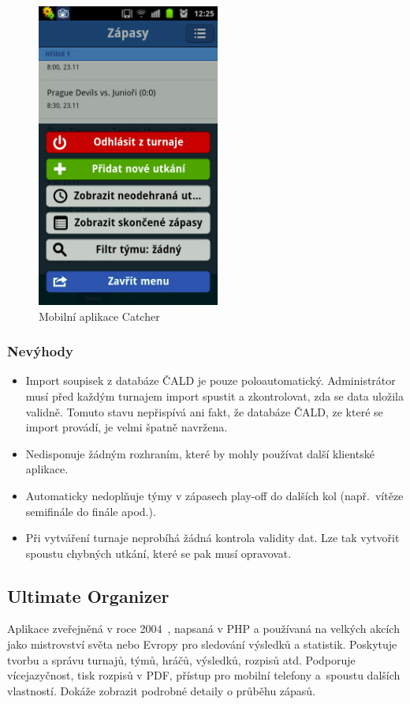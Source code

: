 \begin{figure}[ht!]
\centering
\includegraphics[width=60mm]{./images/catcher.png}
\caption{Mobilní aplikace Catcher~\cite{catcher_play}\label{overflow}}
\label{fig:uwsgi}
\end{figure}

\subsubsection*{Nevýhody}
\begin{itemize}
  \item Import soupisek z databáze ČALD je pouze poloautomatický. Administrátor musí před každým turnajem
    import spustit a zkontrolovat, zda se data uložila validně. Tomuto stavu nepřispívá ani fakt,
    že databáze ČALD, ze které se import provádí, je velmi špatně navržena.
  \item Nedisponuje žádným rozhraním, které by mohly používat další klientské aplikace.
  \item Automaticky nedoplňuje týmy v zápasech play-off do dalších kol (např.~vítěze semifinále do finále apod.).
  \item Při vytváření turnaje neprobíhá žádná kontrola validity dat.
    Lze tak vytvořit spoustu chybných utkání, které se pak musí opravovat. 
\end{itemize}

\subsection*{Ultimate Organizer}

Aplikace zveřejněná v roce 2004~\cite{ultimate_organizer}, napsaná v PHP a používaná na velkých akcích jako mistrovství světa nebo Evropy
pro sledování výsledků a statistik. Poskytuje tvorbu a správu turnajů, týmů, hráčů,
výsledků, rozpisů atd. Podporuje vícejazyčnost, tisk rozpisů v PDF, přístup pro mobilní telefony
a~spoustu dalších vlastností. Dokáže zobrazit podrobné detaily o průběhu zápasů.

